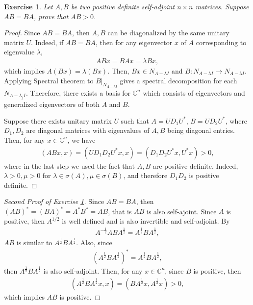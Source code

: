 \documentclass[11pt]{article}
\newtheorem{exercise}{Exercise}[section]
\theoremstyle{definition}
\numberwithin{equation}{subsection}
\begin{document}
\begin{exercise}\label{August_2014_5}
Let $A, B$ be two positive definite self-adjoint $n \times n$ matrices. Suppose $AB = BA$, prove that $AB > 0$.
\end{exercise}
\begin{proof}
Since $AB = BA$, then $A, B$ can be diagonalized by the same unitary matrix $U$. Indeed, if $AB = BA$, then for any eigenvector $x$ of $A$ corresponding to eigenvalue $\lambda$, 
\begin{align*}
    ABx = BAx = \lambda Bx,
\end{align*}
which implies $A(Bx) = \lambda (Bx)$. Then, $Bx \in N_{A - \lambda I}$ and $B: N_{A - \lambda I} \to N_{A - \lambda I}$. Applying Spectral theorem to $B|_{N_{A - \lambda I}}$ gives a spectral decomposition for each $N_{A - \lambda_j I}$. Therefore, there exists a basis for $\mathbb{C}^n$ which consists of eigenvectors and generalized eigenvectors of both $A$ and $B$. 

Suppose there exists unitary matrix $U$ such that $A = UD_1U^*$, $B = UD_2U^*$, where $D_1, D_2$ are diagonal matrices with eigenvalues of $A,B$ being diagonal entries. Then, for any $x \in \mathbb{C}^n$, we have
\begin{align*}
    (ABx, x) = \left(UD_1 D_2 U^*x, x \right) = \left(D_1 D_2 U^*x, U^*x \right) > 0,
\end{align*}
where in the last step we used the fact that $A, B$ are positive definite. Indeed, $\lambda > 0, \mu > 0$ for $\lambda \in \sigma(A), \mu \in \sigma(B)$, and therefore $D_1 D_2$ is positive definite.
\end{proof}

\medskip

\begin{proof}[Second Proof of Exercise \ref{August_2014_5}]
Since $AB = BA$, then $(AB)^* = (BA)^* = A^*B^* = AB$, that is $AB$ is also self-ajoint. Since $A$ is positive, then $A^{1/2}$ is well defined and is also invertible and self-adjoint. By
\begin{align*}
    A^{-\frac{1}{2}} AB A^{\frac{1}{2}} = A^{\frac{1}{2}}B A^{\frac{1}{2}},
\end{align*}
$AB$ is similar to $A^{\frac{1}{2}}B A^{\frac{1}{2}}$. Also, since
\begin{align*}
    \left(A^{\frac{1}{2}}B A^{\frac{1}{2}} \right)^* = A^{\frac{1}{2}}B A^{\frac{1}{2}},
\end{align*}
then $A^{\frac{1}{2}}B A^{\frac{1}{2}}$ is also self-adjoint. Then, for any $x \in \mathbb{C}^n$, since $B$ is positive, then
\begin{align*}
    \left(A^{\frac{1}{2}}B A^{\frac{1}{2}}x, x \right) = \left(B A^{\frac{1}{2}}x, A^{\frac{1}{2}}x \right) > 0,
\end{align*}
which implies $AB$ is positive.
\end{proof}
\end{document}
